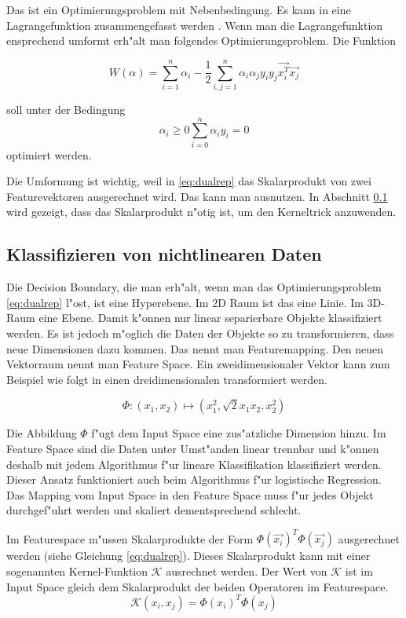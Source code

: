 \documentclass[12pt,a4paper,twoside]{article}
\begin{document}
Das ist ein Optimierungsproblem mit Nebenbedingung. Es kann in eine Lagrangefunktion zusammengefasst werden \cite{cristianini}. Wenn man die Lagrangefunktion ensprechend umformt erh"alt man folgendes Optimierungsproblem. Die Funktion

\begin{equation}
  \label{eq:dualrep}
W(\alpha) = \sum_{i=1}^n \alpha_i - \frac{1}{2} \sum_{i,j = 1}^n \alpha_i \alpha_j y_i y_j \vec{x_i^T} \vec{x_j}  
\end{equation}

soll unter der Bedingung
 \[
\alpha_i \geq 0
\sum_{i=0}^n \alpha_i y_i = 0
\]
optimiert werden.


Die Umformung ist wichtig, weil in \ref{eq:dualrep} das Skalarprodukt von zwei Featurevektoren ausgerechnet wird. Das kann man ausnutzen. In Abschnitt \ref{sec:nonlinear} wird gezeigt, dass das Skalarprodukt n"otig ist, um den Kerneltrick anzuwenden.

\subsection{Klassifizieren von nichtlinearen Daten}
\label{sec:nonlinear}

Die Decision Boundary, die man erh"alt, wenn man das Optimierungsproblem \ref{eq:dualrep} l"ost, ist eine Hyperebene. Im 2D Raum ist das eine Linie. Im 3D-Raum eine Ebene. Damit k"onnen nur linear separierbare Objekte klassifiziert werden. Es ist jedoch m"oglich die Daten der Objekte so zu transformieren, dass neue Dimensionen dazu kommen. Das nennt man Featuremapping. Den neuen Vektorraum nennt man Feature Space. Ein zweidimensionaler Vektor kann zum Beispiel wie folgt in einen dreidimensionalen transformiert werden.

\begin{equation}
  \label{eq:polynomial}
\Phi: (x_1, x_2) \mapsto (x_1^2, \sqrt{2} x_1 x_2, x_2^2)
\end{equation}

Die Abbildung $\Phi$ f"ugt dem Input Space eine zus"atzliche Dimension hinzu. Im Feature Space sind die Daten unter Umst"anden linear trennbar und k"onnen deshalb mit jedem Algorithmus f"ur lineare Klassifikation klassifiziert werden. Dieser Ansatz funktioniert auch beim Algorithmus f"ur logistische Regression. Das Mapping vom Input Space in den Feature Space muss f"ur jedes Objekt durchgef"uhrt werden und skaliert dementsprechend schlecht. 

Im Featurespace m"ussen Skalarprodukte der Form $\Phi(\vec{x_i})^T \Phi(\vec{x_j})$ ausgerechnet werden (siehe Gleichung \ref{eq:dualrep}). Dieses Skalarprodukt kann mit einer sogenannten Kernel-Funktion $\mathcal{K}$ ausrechnet werden. Der Wert von $\mathcal{K}$ ist im Input Space gleich dem Skalarprodukt der beiden Operatoren im Featurespace.
\begin{equation}
  \label{eq:kerneltrick}
  \mathcal{K}(x_i, x_j) = \Phi(x_i)^T \Phi(x_j)
\end{equation}
\end{document}
